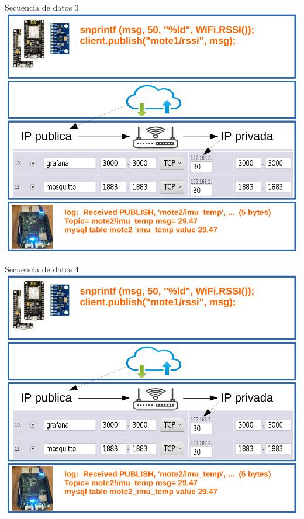 \documentclass[aspectratio= 43]{beamer}
\begin{document}
\begin{frame}{Secuencia de datos 3}
   \centering \includegraphics [scale=0.62,page=3]{./visio/secuence.pdf}
\end{frame}
\begin{frame}{Secuencia de datos 4}
   \centering \includegraphics [scale=0.62,page=4]{./visio/secuence.pdf}
\end{frame}
\end{document}

